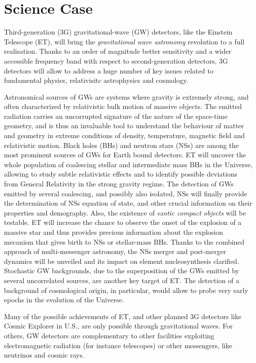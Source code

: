 \chapter{Science Case}
\label{chap:ScienceCase}
Third-generation (3G) gravitational-wave (GW) detectors, like the Einstein Telescope (ET), will bring the {\it gravitational wave astronomy} revolution to a full realisation. Thanks to an order of magnitude better sensitivity and a wider accessible frequency band with respect to second-generation detectors, 3G detectors will allow to address a huge number of key issues related to fundamental physics, relativisitc astrophysics and cosmology. 

Astronomical sources of GWs are systems where gravity is extremely strong, and often characterized by relativistic bulk motion of massive objects. The emitted radiation carries an uncorrupted signature of the nature of the space-time geometry, and is thus an invaluable tool to understand the behaviour of matter and geometry in extreme conditions of density, temperature, magnetic field and relativistic motion.
Black holes (BHs) and neutron stars (NSs) are among the most prominent sources of GWs for Earth bound detectors. ET will uncover the whole population of coalescing stellar and intermediate mass BHs in the Universe, allowing to study subtle relativistic effects and to identify possible deviations from General Relativity in the strong gravity regime. The detection of GWs emitted by several coalescing, and possibly also isolated, NSs will finally provide the determination of NSs equation of state, and other crucial information on their properties and demography. Also, the existence of {\it exotic compact objects} will be testable.
ET will increase the chance to observe the onset of the explosion of a massive star and thus provides precious information about the explosion mecanism that gives birth to NSs or stellar-mass BHs. 
Thanks to the combined approach of multi-messenger astronomy, the NSs merger and post-merger dynamics will be unveiled and its impact on element nucleosynthesis clarified. Stochastic GW backgrounds, due to the superposition of the GWs emitted by several uncorrelated sources, are another key target of ET. The detection of a background of cosmological origin, in particular, would allow to probe very early epochs in the evolution of the Universe. 

Many of the possible achievements of ET, and other planned 3G detectors like Cosmic Explorer in U.S., are only possible through gravitational waves. For others, GW detectors are complementary to other facilities exploiting electromagnetic radiation (for instance telescopes) or other messengers, like neutrinos and cosmic rays. 

